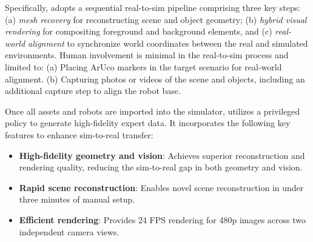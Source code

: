 Specifically, \our adopts a sequential real-to-sim pipeline comprising three key steps: (a) \textit{mesh recovery} for reconstructing scene and object geometry; (b) \textit{hybrid visual rendering} for compositing foreground and background elements, and (c) \textit{real-world alignment} to synchronize world coordinates between the real and simulated environments. Human involvement is minimal in the real-to-sim process and limited to:
(a) Placing ArUco markers in the target scenario for real-world alignment.
(b) Capturing photos or videos of the scene and objects, including an additional capture step to align the robot base.

Once all assets and robots are imported into the simulator, \our utilizes a privileged policy to generate high-fidelity expert data. It incorporates the following key features to enhance sim-to-real transfer:
\vspace{-0.1in}
\begin{itemize}[leftmargin=0.in]
    \item \textbf{High-fidelity geometry and vision}: Achieves superior reconstruction and rendering quality, reducing the sim-to-real gap in both geometry and vision.
    \item \textbf{Rapid scene reconstruction}: Enables novel scene reconstruction in under three minutes of manual setup.
    \item \textbf{Efficient rendering}: Provides 24 FPS rendering for 480p images across two independent camera views.
\end{itemize}

